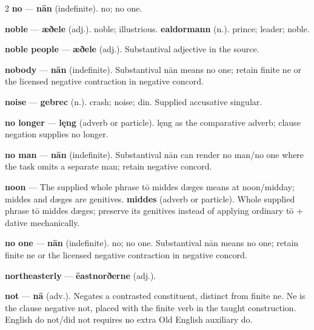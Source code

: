 \begin{multicols}{2}
\textbf{no} — \textbf{nān} (indefinite). no; no one.\par
\textbf{noble} — \textbf{æðele} (adj.). noble; illustrious. \textbf{ealdormann} (n.). prince; leader; noble.\par
\textbf{noble people} — \textbf{æðele} (adj.). Substantival adjective in the source.\par
\textbf{nobody} — \textbf{nān} (indefinite). Substantival nān means no one; retain finite ne or the licensed negative contraction in negative concord.\par
\textbf{noise} — \textbf{gebrec} (n.). crash; noise; din. Supplied accusative singular.\par
\textbf{no longer} — \textbf{lęng} (adverb or particle). lęng as the comparative adverb; clause negation supplies no longer.\par
\textbf{no man} — \textbf{nān} (indefinite). Substantival nān can render no man/no one where the task omits a separate man; retain negative concord.\par
\textbf{noon} — The supplied whole phrase tō middes dæges means at noon/midday; middes and dæges are genitives. \textbf{middes} (adverb or particle). Whole supplied phrase tō middes dæges; preserve its genitives instead of applying ordinary tō + dative mechanically.\par
\textbf{no one} — \textbf{nān} (indefinite). no; no one. Substantival nān means no one; retain finite ne or the licensed negative contraction in negative concord.\par
\textbf{northeasterly} — \textbf{ēastnorðerne} (adj.).\par
\textbf{not} — \textbf{nā} (adv.). Negates a contrasted constituent, distinct from finite ne. Ne is the clause negative not, placed with the finite verb in the taught construction. English do not/did not requires no extra Old English auxiliary do.\par

\end{multicols}
